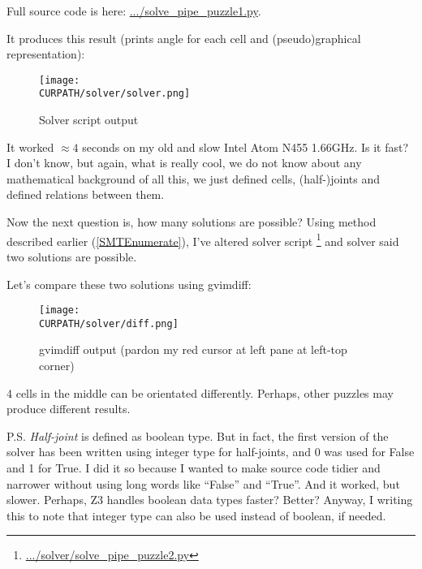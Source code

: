 Full source code is here: \url{.../solve_pipe_puzzle1.py}.

It produces this result (prints angle for each cell and (pseudo)graphical representation):

\begin{figure}[H]
\centering
\texttt{[image: \\CURPATH/solver/solver.png]}
\caption{Solver script output}
\end{figure}

It worked $\approx 4$ seconds on my old and slow Intel Atom N455 1.66GHz.
Is it fast? I don't know, but again, what is really cool, we do not know about any mathematical background
of all this, we just defined cells, (half-)joints and defined relations between them.

Now the next question is, how many solutions are possible?
Using method described earlier (\ref{SMTEnumerate}), I've altered solver script
\footnote{\url{.../solver/solve_pipe_puzzle2.py}} and solver
said two solutions are possible.

Let's compare these two solutions using gvimdiff:

\begin{figure}[H]
\centering
\texttt{[image: \\CURPATH/solver/diff.png]}
\caption{gvimdiff output (pardon my red cursor at left pane at left-top corner)}
\end{figure}

4 cells in the middle can be orientated differently.
Perhaps, other puzzles may produce different results.

P.S.
\textit{Half-joint} is defined as boolean type.
But in fact, the first version of the solver has been written using integer type for half-joints,
and 0 was used for False and 1 for True.
I did it so because I wanted to make source code tidier and narrower without using long words like ``False'' and ``True''.
And it worked, but slower. Perhaps, Z3 handles boolean data types faster? Better?
Anyway, I writing this to note that integer type can also be used instead of boolean, if needed.

